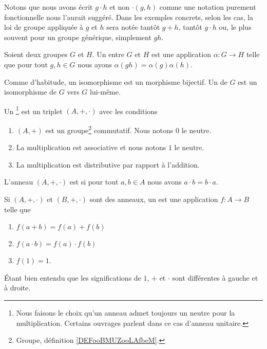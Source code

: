 Notons que nous avons écrit \( g\cdot h\) et non \( \cdot(g,h)\) comme une notation purement fonctionnelle nous l'aurait suggéré. Dans les exemples concrets, selon les cas, la loi de groupe appliquée à \( g\) et \( h\) sera notée tantôt \( g+h\), tantôt \( g\cdot h\) ou, le plus souvent pour un groupe générique, simplement \( gh\).

\begin{definition}        \label{DEFooBEHTooMeCOTX}
	Soient deux groupes \( G\) et \( H\). Un  entre \( G\) et \( H\) est une application \( \alpha\colon G\to H\) telle que pour tout \( g,h\in G\) nous ayons \( \alpha(gh)=\alpha(g)\alpha(h)\).

	Comme d'habitude, un isomorphisme est un morphisme bijectif. Un  de \( G\) est un isomorphisme de \( G\) vers \( G\) lui-même.
\end{definition}

\begin{definition}     \label{DefHXJUooKoovob}
	Un \footnote{Nous faisons le choix qu'un anneau admet toujours un neutre pour la multiplication. Certains ouvrages parlent dans ce cas d'anneau unitaire.} est un triplet \( (A,+,\cdot)\) avec les conditions
	\begin{enumerate}
		\item
		      \( (A,+)\) est un groupe\footnote{Groupe, définition \ref{DEFooBMUZooLAfbeM}.} commutatif. Nous notons \( 0\) le neutre.
		\item
		      La multiplication est associative et nous notons \( 1\) le neutre.
		\item       \label{ITEMooGMNOooSTGiXw}
		      La multiplication est distributive par rapport à l'addition.
	\end{enumerate}
	L'anneau \( (A,+,\cdot)\) est  si pour tout \( a,b\in A\) nous avons \( a\cdot b=b\cdot a\).
\end{definition}


\begin{definition}      \label{DEFooSPHPooCwjzuz}
	Si \( (A,+,\cdot)\) et \( (B,+,\cdot)\) sont des anneaux, un  est une application \( f\colon A\to B\) telle que
	\begin{enumerate}
		\item \( f(a+b)=f(a)+f(b)\)
		\item \( f(a\cdot b)=f(a)\cdot f(b)\)
		\item \( f(1)=1\).
	\end{enumerate}
	Étant bien entendu que les significations de \( 1\), \( +\) et \( \cdot\) sont différentes à gauche et à droite.
\end{definition}

